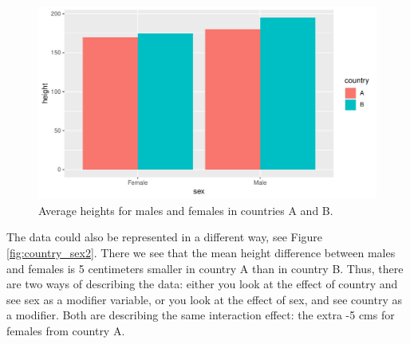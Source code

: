 \documentclass[]{report}\usepackage[]{graphicx}\usepackage[]{color}
\makeatletter
\def\maxwidth{ %
  \ifdim\Gin@nat@width>\linewidth
    \linewidth
  \else
    \Gin@nat@width
  \fi
}
\newenvironment{knitrout}{}{} %
\makeatother
\begin{document}
\begin{knitrout}
\color{fgcolor}\begin{figure}

{\centering \includegraphics[width=\maxwidth]{figure/country_sex1-1} 

}

\caption[Average heights for males and females in countries A and B]{Average heights for males and females in countries A and B.}\label{fig:country_sex1}
\end{figure}


\end{knitrout}


The data could also be represented in a different way, see Figure \ref{fig:country_sex2}. There we see that the mean height difference between males and females is 5 centimeters smaller in country A than in country B. Thus, there are two ways of describing the data: either you look at the effect of country and see sex as a modifier variable, or you look at the effect of sex, and see country as a modifier. Both are describing the same interaction effect: the extra -5 cms for females from country A.
\end{document}
